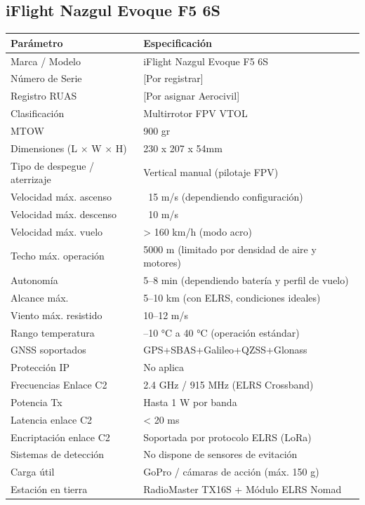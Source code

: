 \subsection*{iFlight Nazgul Evoque F5 6S}
\begin{tabular}{|p{6cm}|p{8cm}|}
\hline
\textbf{Parámetro} & \textbf{Especificación} \\ \hline
Marca / Modelo & iFlight Nazgul Evoque F5 6S \\ \hline
Número de Serie & [Por registrar] \\ \hline
Registro RUAS & [Por asignar Aerocivil] \\ \hline
Clasificación & Multirrotor FPV VTOL \\ \hline
MTOW & 900 gr \\ \hline
Dimensiones (L × W × H) &  230 x 207 x 54mm \\ \hline
Tipo de despegue / aterrizaje & Vertical manual (pilotaje FPV) \\ \hline
Velocidad máx. ascenso & ~15 m/s (dependiendo configuración) \\ \hline
Velocidad máx. descenso & ~10 m/s \\ \hline
Velocidad máx. vuelo & > 160 km/h (modo acro) \\ \hline
Techo máx. operación & 5000 m (limitado por densidad de aire y motores) \\ \hline
Autonomía & 5–8 min (dependiendo batería y perfil de vuelo) \\ \hline
Alcance máx. & 5–10 km (con ELRS, condiciones ideales) \\ \hline
Viento máx. resistido & 10–12 m/s \\ \hline
Rango temperatura & –10 °C a 40 °C (operación estándar) \\ \hline
GNSS soportados & GPS+SBAS+Galileo+QZSS+Glonass \\ \hline
Protección IP & No aplica \\ \hline
Frecuencias Enlace C2 & 2.4 GHz / 915 MHz (ELRS Crossband) \\ \hline
Potencia Tx & Hasta 1 W por banda \\ \hline
Latencia enlace C2 & < 20 ms  \\ \hline
Encriptación enlace C2 & Soportada por protocolo ELRS (LoRa) \\ \hline
Sistemas de detección & No dispone de sensores de evitación \\ \hline
Carga útil & GoPro / cámaras de acción (máx. 150 g) \\ \hline
Estación en tierra & RadioMaster TX16S + Módulo ELRS Nomad \\ \hline
\end{tabular}


